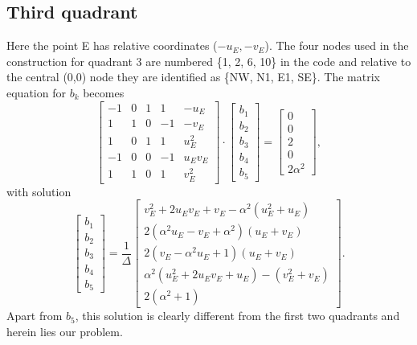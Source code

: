 \documentclass[12pt,letterpaper,margin=0.5in]{article}
\begin{document}
\subsection{Third quadrant}
Here the point E has relative coordinates ($-u_E, -v_E$).  The four nodes used in the
construction for quadrant 3 are numbered \{1, 2, 6, 10\} in the code and relative to the central (0,0) node they
are identified as \{NW, N1, E1, SE\}. The matrix equation for $b_k$ becomes
\begin{equation}
\left[ {\begin{array}{*{20}{r}}
{ - 1}&0&1&1&{ - {u_E}}\\
1&1&0&{ - 1}&{ - {v_E}}\\
1&0&1&1&{u_E^2}\\
{ - 1}&0&0&{ - 1}&{{u_E}{v_E}}\\
1&1&0&1&{v_E^2}
\end{array}} \right] \cdot \left[ {\begin{array}{*{20}{c}}
{{b_1}}\\
{{b_2}}\\
{{b_3}}\\
{{b_4}}\\
{{b_5}}
\end{array}} \right] = \left[ {\begin{array}{*{20}{c}}
0\\
0\\
2\\
0\\
2\alpha^2
\end{array}} \right],
\end{equation}
with solution
\begin{equation}
\left[ {\begin{array}{*{20}{c}}
{{b_1}}\\
{{b_2}}\\
{{b_3}}\\
{{b_4}}\\
{{b_5}}
\end{array}} \right] = \frac{1}{\Delta }\left[ {\begin{array}{*{20}{c}}
{v_E^2 + 2{u_E}{v_E} + {v_E} - \alpha^2(u_E^2 + {u_E})}\\[4pt]
{2\left( {\alpha^2{u_E} - {v_E} + \alpha^2} \right)\left( {{u_E} + {v_E}} \right)}\\[4pt]
{2\left( {{v_E} - \alpha^2{u_E} + 1} \right)\left( {{u_E} + {v_E}} \right)}\\[4pt]
{\alpha^2(u_E^2 + 2{u_E}{v_E} + {u_E}) - (v_E^2 + {v_E})}\\[4pt]
2(\alpha^2+1)
\end{array}} \right].
\label{eq:lower}
\end{equation}
Apart from $b_5$, this solution is clearly different from the first two quadrants and herein lies our problem.
\end{document}
